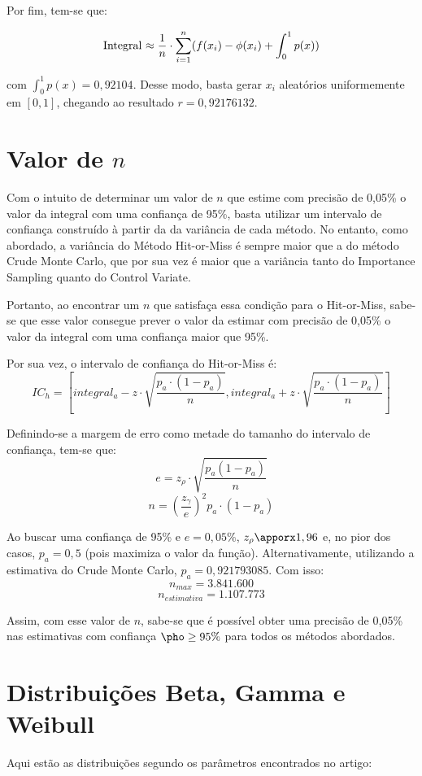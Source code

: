 \documentclass{article}
\begin{document}
Por fim, tem-se que:

  \[
  \text{Integral $ \approx \frac{1}{n} \cdot \sum_{i=1}^{n}$} (f(x_i) - \phi(x_i) + \int_0^1p(x))
  \]

com $\int_0^1p(x) = 0,92104$. Desse modo, basta gerar $x_i$ aleatórios uniformemente em $[0, 1]$, chegando ao resultado $r = 0,92176132$.

\section{Valor de $n$}
Com o intuito de determinar um valor de $n$ que estime com precisão de 0,05\% o valor da integral com uma confiança de 95\%, basta utilizar um intervalo de confiança construído à partir da da variância de cada método. No entanto, como abordado, a variância do Método Hit-or-Miss é sempre maior que a do método Crude Monte Carlo, que por sua vez é maior que a variância tanto do Importance Sampling quanto do Control Variate.

Portanto, ao encontrar um $n$ que satisfaça essa condição para o Hit-or-Miss, sabe-se que esse valor consegue prever o valor da estimar com precisão de 0,05\% o valor da integral com uma confiança maior que 95\%.

Por sua vez, o intervalo de confiança do Hit-or-Miss é:
$$IC_h = \left[integral_a - z \cdot \sqrt{\frac{p_a \cdot (1 - p_a)}{n}}, integral_a + z \cdot \sqrt{\frac{p_a \cdot (1 - p_a)}{n}}\right]$$

Definindo-se a margem de erro como metade do tamanho do intervalo de confiança, tem-se que: $$e = z_\rho \cdot \sqrt{\frac{p_a (1 - p_a)}{n}}$$ $$n = \left(\frac{z_\gamma}{e}\right)^{2}  p_a \cdot (1 - p_a)$$

Ao buscar uma confiança de 95\% e $e = 0,05\%$, $z_\rho\apporx1,96$ e, no pior dos casos, $p_a=0,5$ (pois maximiza o valor da função). Alternativamente, utilizando a estimativa do Crude Monte Carlo, $p_a = 0,921793085$. Com isso:
$$n_{max} = 3.841.600$$
$$n_{estimativa} = 1.107.773$$

Assim, com esse valor de $n$, sabe-se que é possível obter uma precisão de 0,05\% nas estimativas com confiança $\pho \geq 95\%$ para todos os métodos abordados.

\section{Distribuições Beta, Gamma e Weibull}
Aqui estão as distribuições segundo os parâmetros encontrados no artigo:
\end{document}
